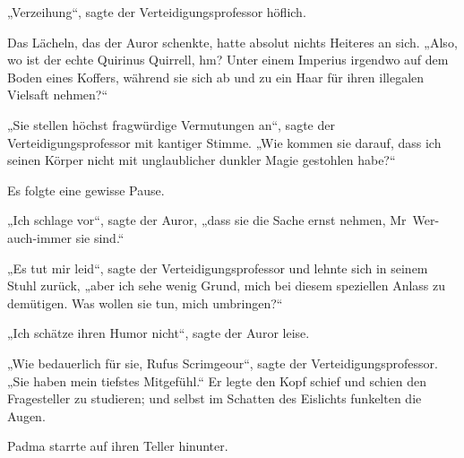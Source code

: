 „Verzeihung“, sagte der Verteidigungsprofessor höflich.

Das Lächeln, das der Auror schenkte, hatte absolut nichts Heiteres an sich.
„Also, wo ist der echte Quirinus Quirrell, hm? Unter einem Imperius irgendwo auf dem Boden eines Koffers, während sie sich ab und zu ein Haar für ihren illegalen Vielsaft nehmen?“

„Sie stellen höchst fragwürdige Vermutungen an“, sagte der Verteidigungsprofessor mit kantiger Stimme.
„Wie kommen sie darauf, dass ich seinen Körper nicht mit unglaublicher dunkler Magie gestohlen habe?“

Es folgte eine gewisse Pause.

„Ich schlage vor“, sagte der Auror, „dass sie die Sache ernst nehmen, Mr~Wer-auch-immer sie sind.“

„Es tut mir leid“, sagte der Verteidigungsprofessor und lehnte sich in seinem Stuhl zurück, „aber ich sehe wenig Grund, mich bei diesem speziellen Anlass zu demütigen. Was wollen sie tun, mich umbringen?“

„Ich schätze ihren Humor nicht“, sagte der Auror leise.

„Wie bedauerlich für sie, Rufus Scrimgeour“, sagte der Verteidigungsprofessor.
„Sie haben mein tiefstes Mitgefühl.“ Er legte den Kopf schief und schien den Fragesteller zu studieren; und selbst im Schatten des Eislichts funkelten die Augen.

\later

Padma starrte auf ihren Teller hinunter.

